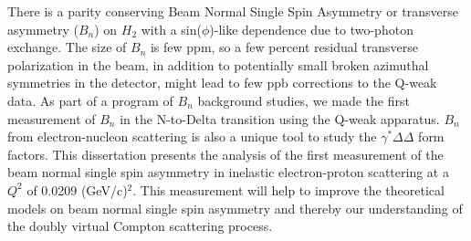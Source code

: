 There is a parity conserving Beam Normal Single Spin Asymmetry or transverse asymmetry ($B_{n}$) on $H_{2}$ with a sin($\phi$)-like dependence due to two-photon exchange. The size of $B_{n}$ is few ppm, so a few percent residual transverse polarization in the beam, in addition to potentially small broken azimuthal symmetries in the detector, might lead to few ppb corrections to the Q-weak data. As part of a program of $B_{n}$ background studies, we made the first measurement of $B_{n}$ in the N-to-Delta transition using the Q-weak apparatus. $B_{n}$ from electron-nucleon scattering is also a unique tool to study the $\gamma^{*}\Delta\Delta$ form factors. 
This dissertation presents the analysis of the first measurement of the beam normal single spin asymmetry in inelastic electron-proton scattering at a $Q^{2}$ of 0.0209 (GeV/c)$^{2}$. This measurement will help to improve the theoretical models on beam normal single spin asymmetry and thereby our understanding of the doubly virtual Compton scattering process.

